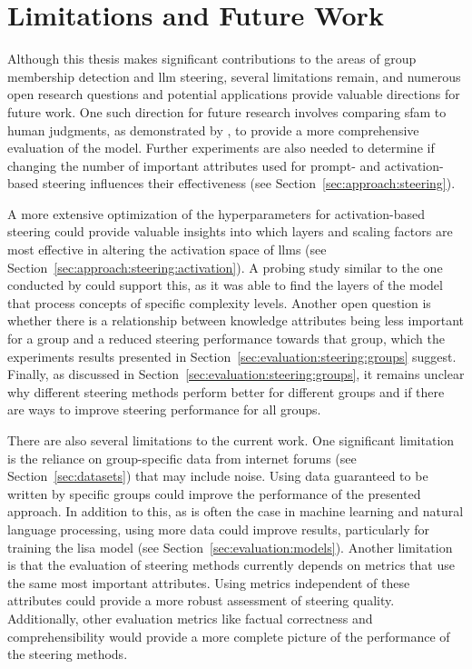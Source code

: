 \section{Limitations and Future Work}
Although this thesis makes significant contributions to the areas of group membership detection and \ac{llm} steering, several limitations remain, and numerous open research questions and potential applications provide valuable directions for future work.
One such direction for future research involves comparing \ac{sfam} to human judgments, as demonstrated by \citet{patelLearningInterpretableStyle2023}, to provide a more comprehensive evaluation of the model. Further experiments are also needed to determine if changing the number of important attributes used for prompt- and activation-based steering influences their effectiveness (see Section~\ref{sec:approach:steering}).

A more extensive optimization of the hyperparameters for activation-based steering could provide valuable insights into which layers and scaling factors are most effective in altering the activation space of \acp{llm} (see Section~\ref{sec:approach:steering:activation}). A probing study similar to the one conducted by \citet{konenStyleVectorsSteering2024} could support this, as it was able to find the layers of the model that process concepts of specific complexity levels. Another open question is whether there is a relationship between knowledge attributes being less important for a group and a reduced steering performance towards that group, which the experiments results presented in Section~\ref{sec:evaluation:steering:groups} suggest. Finally, as discussed in Section~\ref{sec:evaluation:steering:groups}, it remains unclear why different steering methods perform better for different groups and if there are ways to improve steering performance for all groups.

There are also several limitations to the current work. One significant limitation is the reliance on group-specific data from internet forums (see Section~\ref{sec:datasets}) that may include noise. Using data guaranteed to be written by specific groups could improve the performance of the presented approach. In addition to this, as is often the case in machine learning and natural language processing, using more data could improve results, particularly for training the \ac{lisa} model (see Section~\ref{sec:evaluation:models}).
Another limitation is that the evaluation of steering methods currently depends on metrics that use the same most important attributes. Using metrics independent of these attributes could provide a more robust assessment of steering quality. Additionally, other evaluation metrics like factual correctness and comprehensibility would provide a more complete picture of the performance of the steering methods.

